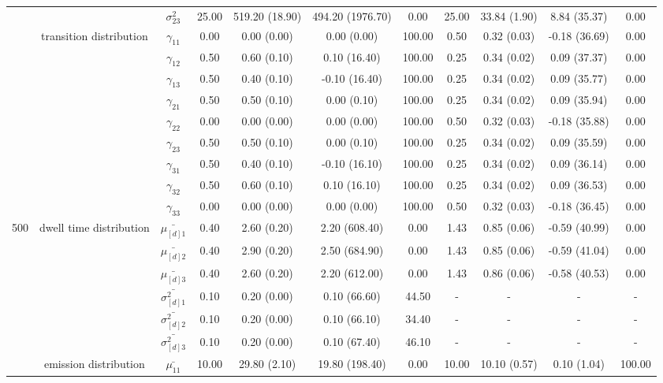 \begin{table}[h]
{\begin{tabular}{ccccccccccc}
 &  & $\sigma^2_{23}$ & 25.00 & 519.20 (18.90) & 494.20 (1976.70) & 0.00 & 25.00 & 33.84 (1.90) & 8.84 (35.37) & 0.00 \\
 & transition distribution & $\gamma_{11}$ & 0.00 & 0.00 (0.00) & 0.00 (0.00) & 100.00 & 0.50 & 0.32 (0.03) & -0.18 (36.69) & 0.00 \\
 & \multirow{8}{*}{} & $\gamma_{12}$ & 0.50 & 0.60 (0.10) & 0.10 (16.40) & 100.00 & 0.25 & 0.34 (0.02) & 0.09 (37.37) & 0.00 \\
 &  & $\gamma_{13}$ & 0.50 & 0.40 (0.10) & -0.10 (16.40) & 100.00 & 0.25 & 0.34 (0.02) & 0.09 (35.77) & 0.00 \\
 &  & $\gamma_{21}$ & 0.50 & 0.50 (0.10) & 0.00 (0.10) & 100.00 & 0.25 & 0.34 (0.02) & 0.09 (35.94) & 0.00 \\
 &  & $\gamma_{22}$ & 0.00 & 0.00 (0.00) & 0.00 (0.00) & 100.00 & 0.50 & 0.32 (0.03) & -0.18 (35.88) & 0.00 \\
 &  & $\gamma_{23}$ & 0.50 & 0.50 (0.10) & 0.00 (0.10) & 100.00 & 0.25 & 0.34 (0.02) & 0.09 (35.59) & 0.00 \\
 &  & $\gamma_{31}$ & 0.50 & 0.40 (0.10) & -0.10 (16.10) & 100.00 & 0.25 & 0.34 (0.02) & 0.09 (36.14) & 0.00 \\
 &  & $\gamma_{32}$ & 0.50 & 0.60 (0.10) & 0.10 (16.10) & 100.00 & 0.25 & 0.34 (0.02) & 0.09 (36.53) & 0.00 \\
 &  & $\gamma_{33}$ & 0.00 & 0.00 (0.00) & 0.00 (0.00) & 100.00 & 0.50 & 0.32 (0.03) & -0.18 (36.45) & 0.00 \\ \midrule
500 & dwell time distribution & $\bar{\mu_{[d]1}}$ & 0.40 & 2.60 (0.20) & 2.20 (608.40) & 0.00 & 1.43 & 0.85 (0.06) & -0.59 (40.99) & 0.00 \\
\multirow{26}{*}{} & \multirow{5}{*}{} & $\bar{\mu_{[d]2}}$ & 0.40 & 2.90 (0.20) & 2.50 (684.90) & 0.00 & 1.43 & 0.85 (0.06) & -0.59 (41.04) & 0.00 \\
 &  & $\bar{\mu_{[d]3}}$ & 0.40 & 2.60 (0.20) & 2.20 (612.00) & 0.00 & 1.43 & 0.86 (0.06) & -0.58 (40.53) & 0.00 \\
 &  & $\bar{\sigma^2_{[d]1}}$ & 0.10 & 0.20 (0.00) & 0.10 (66.60) & 44.50 & - & - & - & - \\
 &  & $\bar{\sigma^2_{[d]2}}$ & 0.10 & 0.20 (0.00) & 0.10 (66.10) & 34.40 & - & - & - & - \\
 &  & $\bar{\sigma^2_{[d]3}}$ & 0.10 & 0.20 (0.00) & 0.10 (67.40) & 46.10 & - & - & - & - \\
 & emission distribution & $\bar{\mu_{11}}$ & 10.00 & 29.80 (2.10) & 19.80 (198.40) & 0.00 & 10.00 & 10.10 (0.57) & 0.10 (1.04) & 100.00 \\

\end{tabular}}
\end{table}
